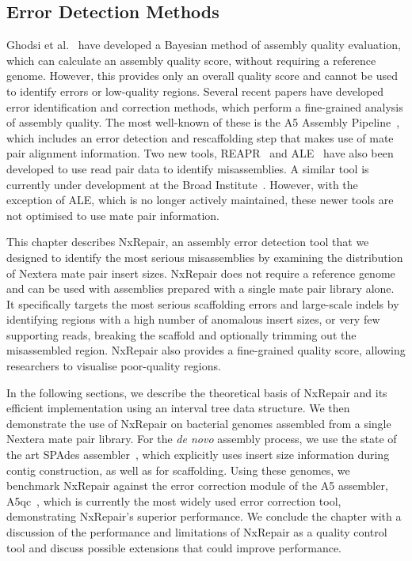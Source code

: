 \subsection{Error Detection Methods}
Ghodsi et al.~\cite{Ghodsi2013} have developed a Bayesian method of assembly quality evaluation, which can calculate an assembly quality score, without requiring a reference genome. However, this provides only an overall quality score and cannot be used to identify errors or low-quality regions. Several recent papers have developed error identification and correction methods, which perform a fine-grained analysis of assembly quality. The most well-known of these is the A5 Assembly Pipeline~\cite{Coil2014, tritt2012}, which includes an error detection and rescaffolding step that makes use of mate pair alignment information. Two new tools, REAPR~\cite{Hunt2013} and ALE~\cite{Clark2013} have also been developed to use read pair data to identify misassemblies. A similar tool is currently under development at the Broad Institute~\cite{pilon2014}. However, with the exception of ALE, which is no longer actively maintained, these newer tools are not optimised to use mate pair information.  

This chapter describes NxRepair, an assembly error detection tool that we designed to identify the most serious misassemblies by examining the distribution of Nextera mate pair insert sizes. NxRepair does not require a reference genome and can be used with assemblies prepared with a single mate pair library alone. It specifically targets the most serious scaffolding errors and large-scale indels by identifying regions with a high number of anomalous insert sizes, or very few supporting reads, breaking the scaffold and optionally trimming out the misassembled region. NxRepair also provides a fine-grained quality score, allowing researchers to visualise poor-quality regions. 

In the following sections, we describe the theoretical basis of NxRepair and its efficient implementation using an interval tree data structure. We then demonstrate the use of NxRepair on bacterial genomes assembled from a single Nextera mate pair library. For the \textit{de novo} assembly process, we use the state of the art SPAdes assembler~\cite{Bankevich2012}, which explicitly uses insert size information during contig construction, as well as for scaffolding. Using these genomes, we benchmark NxRepair against the error correction module of the A5 assembler, A5qc~\cite{tritt2012}, which is currently the most widely used error correction tool, demonstrating NxRepair's superior performance. We conclude the chapter with a discussion of the performance and limitations of NxRepair as a quality control tool and discuss possible extensions that could improve performance.

